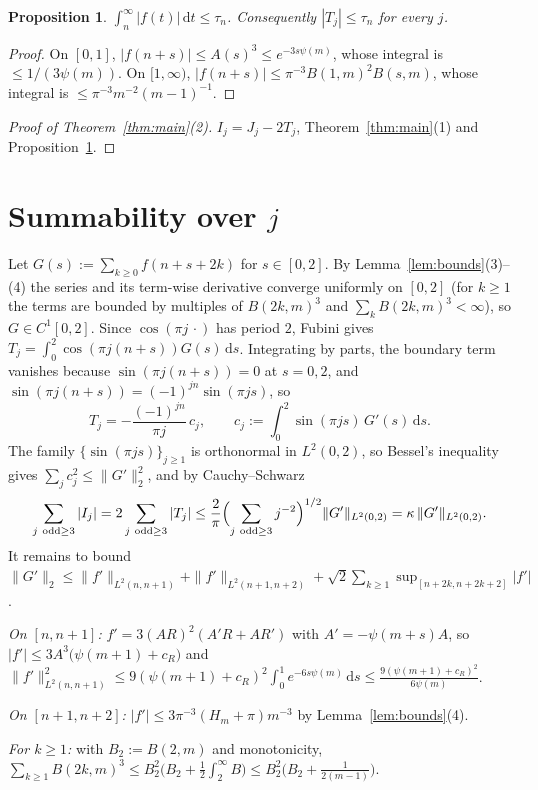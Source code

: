 \documentclass[11pt]{amsart}
\newtheorem{proposition}[theorem]{Proposition}
\theoremstyle{remark}
\newcommand{\dd}{\,\mathrm{d}}
\begin{document}
\begin{proposition}\label{prop:tail}
$\int_n^\infty|f(t)|\dd t\le\tau_n$. Consequently $|T_j|\le\tau_n$ for every $j$.
\end{proposition}
\begin{proof}
On $[0,1]$, $|f(n+s)|\le A(s)^3\le e^{-3s\psi(m)}$, whose integral is $\le1/(3\psi(m))$. On $[1,\infty)$,
$|f(n+s)|\le\pi^{-3}B(1,m)^2B(s,m)$, whose integral is $\le\pi^{-3}m^{-2}(m-1)^{-1}$.
\end{proof}

\begin{proof}[Proof of Theorem~\ref{thm:main}(2)]
$I_j=J_j-2T_j$, Theorem~\ref{thm:main}(1) and Proposition~\ref{prop:tail}.
\end{proof}

\section{Summability over \texorpdfstring{$j$}{j}}

Let $G(s):=\sum_{k\ge0}f(n+s+2k)$ for $s\in[0,2]$. By Lemma~\ref{lem:bounds}(3)--(4) the series and its term-wise derivative
converge uniformly on $[0,2]$ (for $k\ge1$ the terms are bounded by multiples of $B(2k,m)^3$ and $\sum_kB(2k,m)^3<\infty$),
so $G\in C^1[0,2]$. Since $\cos(\pi j\,\cdot)$ has period $2$, Fubini gives
$T_j=\int_0^2\cos(\pi j(n+s))G(s)\dd s$. Integrating by parts, the boundary term vanishes because $\sin(\pi j(n+s))=0$ at $s=0,2$,
and $\sin(\pi j(n+s))=(-1)^{jn}\sin(\pi js)$, so
\[
T_j=-\frac{(-1)^{jn}}{\pi j}\,c_j,\qquad c_j:=\int_0^2\sin(\pi js)\,G'(s)\dd s .
\]
The family $\{\sin(\pi js)\}_{j\ge1}$ is orthonormal in $L^2(0,2)$, so Bessel's inequality gives $\sum_j c_j^2\le\|G'\|_2^2$, and by Cauchy--Schwarz
\[
\sum_{j\ \mathrm{odd}\ge3}|I_j|=2\sum_{j\ \mathrm{odd}\ge3}|T_j|\le\frac2\pi\Bigl(\sum_{j\ \mathrm{odd}\ge3}j^{-2}\Bigr)^{1/2}\|G'\|_{L^2(0,2)}
=\kappa\,\|G'\|_{L^2(0,2)} .
\]
It remains to bound $\|G'\|_2\le\|f'\|_{L^2(n,n+1)}+\|f'\|_{L^2(n+1,n+2)}+\sqrt2\sum_{k\ge1}\sup_{[n+2k,n+2k+2]}|f'|$.

\emph{On $[n,n+1]$:} $f'=3(AR)^2(A'R+AR')$ with $A'=-\psi(m+s)A$, so $|f'|\le3A^3\bigl(\psi(m+1)+c_R\bigr)$ and
$\|f'\|^2_{L^2(n,n+1)}\le9(\psi(m+1)+c_R)^2\int_0^1e^{-6s\psi(m)}\dd s\le\frac{9(\psi(m+1)+c_R)^2}{6\psi(m)}$.

\emph{On $[n+1,n+2]$:} $|f'|\le3\pi^{-3}(H_m+\pi)m^{-3}$ by Lemma~\ref{lem:bounds}(4).

\emph{For $k\ge1$:} with $B_2:=B(2,m)$ and monotonicity, $\sum_{k\ge1}B(2k,m)^3\le B_2^2\bigl(B_2+\frac12\int_2^\infty B\bigr)\le B_2^2\bigl(B_2+\frac1{2(m-1)}\bigr)$.
\end{document}

